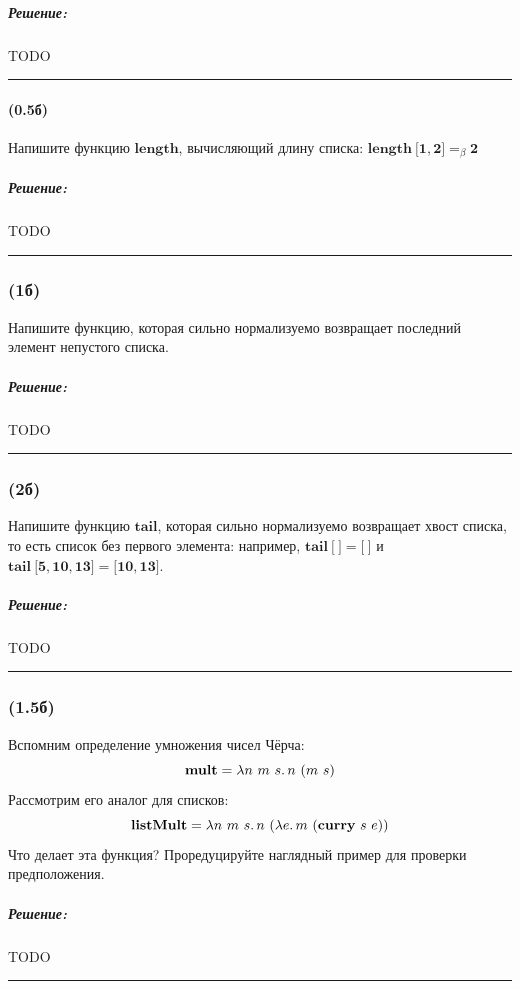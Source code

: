 \documentclass{article}
\newenvironment{proof}{\subparagraph{\hspace{-1em}Решение:\newline}}{\par\noindent\rule{\textwidth}{0.4pt}}
\newcommand{\term}[1]{\mathbf{#1}}
\newcommand{\ap}{~}
\newcommand{\eqbeta}{=_\beta}
\newcommand{\tlist}[1]{\term{[}#1\term{]}} %
\begin{document}
    \begin{proof}
        TODO %
    \end{proof}

    \paragraph{(0.5б)}

    Напишите функцию $\term{length}$, вычисляющий длину списка: $\term{length} \ap \tlist{\term{1}, \term{2}} \eqbeta \term{2}$

    \begin{proof}
        TODO %
    \end{proof}

    \subsubsection{(1б)}

    Напишите функцию, которая сильно нормализуемо возвращает последний элемент непустого списка.

    \begin{proof}
        TODO %
    \end{proof}

    \subsubsection{(2б)}

    Напишите функцию $\term{tail}$, которая сильно нормализуемо возвращает хвост списка, то есть список без первого элемента: например, $\term{tail}~\tlist{~} = \tlist{~}$ и $\term{tail}~\tlist{\term{5},\term{10},\term{13}} = \tlist{\term{10}, \term{13}}$.

    \begin{proof}
        TODO %
    \end{proof}

    \subsubsection{(1.5б)}

    Вспомним определение умножения чисел Чёрча:
    \[\term{mult} = \lambda n~m~s\ldotp n~(m~s)\]
    Рассмотрим его аналог для списков:
    \[\term{listMult} = \lambda n~m~s\ldotp n~(\lambda e\ldotp m~(\term{curry}~s~e))\]
    Что делает эта функция?
    Проредуцируйте наглядный пример для проверки предположения.

    \begin{proof}
        TODO %
    \end{proof}
\end{document}
